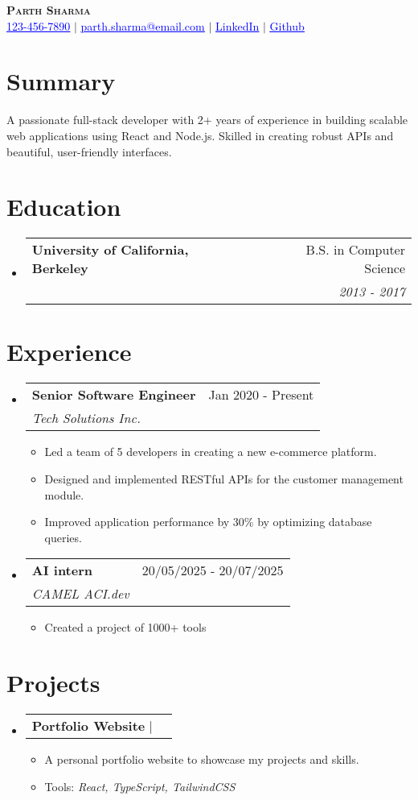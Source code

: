 \documentclass[letterpaper,11pt]{article}
\makeatletter
\newcommand{\resumeItem}[1]{\item\small{{#1 \vspace{-2pt}}}}
\newcommand{\resumeSubheading}[4]{\vspace{-2pt}\item\begin{tabular*}{0.97\textwidth}[t]{l@{\extracolsep{\fill}}r}\textbf{#1} & #2 \\ \textit{\small#3} & \textit{\small #4} \\ \end{tabular*}\vspace{-7pt}}
\newcommand{\resumeProjectHeading}[2]{\item\begin{tabular*}{0.97\textwidth}{l@{\extracolsep{\fill}}r}\small#1 & #2 \\ \end{tabular*}\vspace{-7pt}}
\newcommand{\resumeSubHeadingListStart}{\begin{itemize}[leftmargin=0.15in, label={}]}
\newcommand{\resumeSubHeadingListEnd}{\end{itemize}}
\newcommand{\resumeItemListStart}{\begin{itemize}}
\newcommand{\resumeItemListEnd}{\end{itemize}\vspace{-5pt}}
\makeatother
\begin{document}
\begin{center}
    \textbf{\Huge \scshape Parth Sharma} \\ \vspace{1pt}
    \small \href{tel:123-456-7890}{\textcolor{blue}{\underline{123-456-7890}}} $|$ \href{mailto:parth.sharma@email.com}{\textcolor{blue}{\underline{parth.sharma@email.com}}} $|$ \href{https://linkedin.com/in/johndoe}{\textcolor{blue}{\underline{LinkedIn}}} $|$ \href{https://github.com/parthshr370}{\textcolor{blue}{\underline{Github}}}
\end{center}

\section{Summary}
\small{A passionate full-stack developer with 2+ years of experience in building scalable web applications using React and Node.js. Skilled in creating robust APIs and beautiful, user-friendly interfaces.}

\section{Education}
  \resumeSubHeadingListStart
    \resumeSubheading
      {University of California, Berkeley}{B.S. in Computer Science}
      {}{2013 - 2017}
  \resumeSubHeadingListEnd

\section{Experience}
  \resumeSubHeadingListStart
    \resumeSubheading
      {Senior Software Engineer}{Jan 2020 - Present}
      {Tech Solutions Inc.}{}
      \resumeItemListStart
        \resumeItem{Led a team of 5 developers in creating a new e-commerce platform.}
        \resumeItem{Designed and implemented RESTful APIs for the customer management module.}
        \resumeItem{Improved application performance by 30\% by optimizing database queries.}
      \resumeItemListEnd
    \resumeSubheading
      {AI intern}{20/05/2025 - 20/07/2025}
      {CAMEL ACI.dev}{}
      \resumeItemListStart
        \resumeItem{Created a project of 1000+ tools}
      \resumeItemListEnd
  \resumeSubHeadingListEnd

\section{Projects}
  \resumeSubHeadingListStart
    \resumeProjectHeading
      {\textbf{Portfolio Website} $|$ \emph{}}{}
      \resumeItemListStart
        \resumeItem{A personal portfolio website to showcase my projects and skills.}
        \resumeItem{Tools: \textit{React, TypeScript, TailwindCSS}}
      \resumeItemListEnd
  \resumeSubHeadingListEnd
\end{document}
